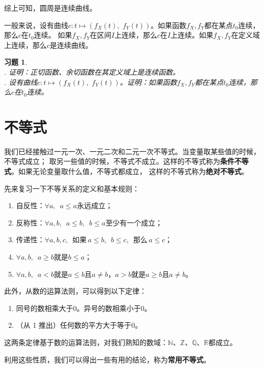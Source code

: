 \documentclass[12pt,UTF8]{ctexbook}
\newtheorem{xt}{习题}[section]
\begin{document}
综上可知，圆周是连续曲线。

一般来说，设有曲线$c: t\mapsto (f_X(t), \,\, f_Y(t))$。如果函数$f_X, f_Y$都在某点$t_0$连续，那么$c$在$t_0$连续。
如果$f_X, f_Y$在区间$I$上连续，那么$c$在$I$上连续。如果$f_X, f_Y$在定义域上连续，那么$c$是连续曲线。

\begin{xt}
    \mbox{} \\
    . 证明：正切函数、余切函数在其定义域上是连续函数。\\
    . 设有曲线$c: t\mapsto (f_X(t), \,\, f_Y(t))$。证明：如果函数$f_X, f_Y$都在某点$t_0$连续，那么$c$在$t_0$连续。
\end{xt}

\chapter{不等式}

我们已经接触过一元一次、一元二次和二元一次不等式。当变量取某些值的时候，不等式成立；
取另一些值的时候，不等式不成立。这样的不等式称为\textbf{条件不等式}。如果无论变量取什么值，不等式都成立，
这样的不等式称为\textbf{绝对不等式}。

先来复习一下不等关系的定义和基本规则：
\begin{enumerate}
    \item 自反性：$\forall a, \,\,\, a \leqslant a$永远成立；
    \item 反称性：$\forall a, b, \,\,\, a \leqslant b, \,\,\, b \leqslant a$至少有一个成立；
    \item 传递性：$\forall a, b, c, \,\,\, \mbox{如果}\, a \leqslant b, \,\,\, b \leqslant c, \,\,\, \mbox{那么}\, a \leqslant c$；
    \item $\forall a, b, \,\,\, a \geqslant b$就是$b \leqslant a$；
    \item $\forall a, b, \,\,\, a < b$就是$a \leqslant b$且$a \neq b$，$ a > b$就是$a \geqslant b$且$a \neq b$。
\end{enumerate}
此外，从数的运算法则，可以得到以下定律：
\begin{enumerate}
    \item 同号的数相乘大于$0$。异号的数相乘小于$0$。
    \item （从 1 推出）任何数的平方大于等于$0$。
\end{enumerate}
这两条定律基于数的运算法则，对我们熟知的数域：$\mathbb{N}$、$\mathbb{Z}$、$\mathbb{Q}$、$\mathbb{R}$都成立。

利用这些性质，我们可以得出一些有用的结论，称为\textbf{常用不等式}。
\end{document}
